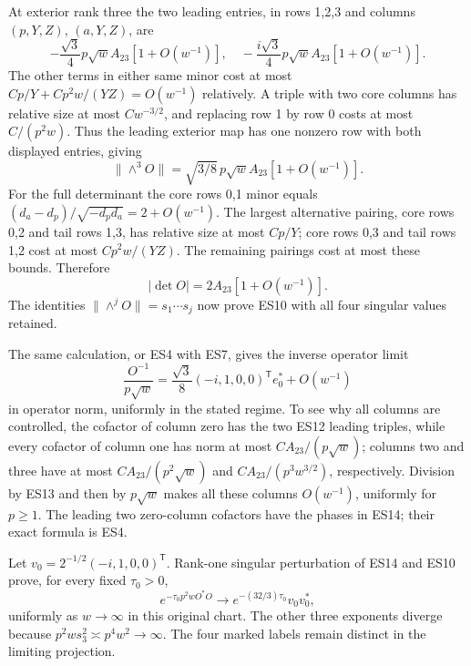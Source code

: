 At exterior rank three the two leading entries, in rows 1,2,3 and columns \((p,Y,Z)\), \((a,Y,Z)\), are \[
-\frac{\sqrt3}{4}p\sqrt w A_{23}[1+O(w^{-1})],\quad
-\frac{i\sqrt3}{4}p\sqrt w A_{23}[1+O(w^{-1})].
\] The other terms in either same minor cost at most \(Cp/Y+Cp^2w/(YZ)=O(w^{-1})\) relatively. A triple with two core columns has relative size at most \(Cw^{-3/2}\), and replacing row 1 by row 0 costs at most \(C/(p^2w)\). Thus the leading exterior map has one nonzero row with both displayed entries, giving \[
\|\wedge^3O\|=\sqrt{3/8}\,p\sqrt w A_{23}[1+O(w^{-1})].
\tag{ES12}
\] For the full determinant the core rows 0,1 minor equals \((d_a-d_p)/\sqrt{-d_pd_a}=2+O(w^{-1})\). The largest alternative pairing, core rows 0,2 and tail rows 1,3, has relative size at most \(Cp/Y\); core rows 0,3 and tail rows 1,2 cost at most \(Cp^2w/(YZ)\). The remaining pairings cost at most these bounds. Therefore \[
|\det O|=2A_{23}[1+O(w^{-1})].
\tag{ES13}
\] The identities \(\|\wedge^jO\|=s_1\cdots s_j\) now prove ES10 with all four singular values retained.

The same calculation, or ES4 with ES7, gives the inverse operator limit \[
\frac{O^{-1}}{p\sqrt w}=\frac{\sqrt3}{8}(-i,1,0,0)^{\mathsf T}e_0^*+O(w^{-1})
\tag{ES14}
\] in operator norm, uniformly in the stated regime. To see why all columns are controlled, the cofactor of column zero has the two ES12 leading triples, while every cofactor of column one has norm at most \(CA_{23}/(p\sqrt w)\); columns two and three have at most \(CA_{23}/(p^2\sqrt w)\) and \(CA_{23}/(p^3w^{3/2})\), respectively. Division by ES13 and then by \(p\sqrt w\) makes all these columns \(O(w^{-1})\), uniformly for \(p\ge1\). The leading two zero-column cofactors have the phases in ES14; their exact formula is ES4.

Let \(v_0=2^{-1/2}(-i,1,0,0)^{\mathsf T}\). Rank-one singular perturbation of ES14 and ES10 prove, for every fixed \(\tau_0>0\), \[
e^{-\tau_0p^2wO^*O}\longrightarrow e^{-(32/3)\tau_0}v_0v_0^*,
\tag{ES15}
\] uniformly as \(w\to\infty\) in this original chart. The other three exponents diverge because \(p^2w s_3^2\asymp p^4w^2\to\infty\). The four marked labels remain distinct in the limiting projection.
